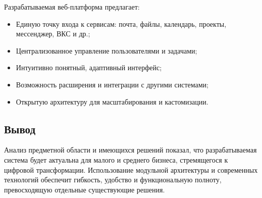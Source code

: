 Разрабатываемая веб-платформа предлагает:
\begin{itemize}
  \item Единую точку входа к сервисам: почта, файлы, календарь, проекты, мессенджер, ВКС и др.;
  \item Централизованное управление пользователями и задачами;
  \item Интуитивно понятный, адаптивный интерфейс;
  \item Возможность расширения и интеграции с другими системами;
  \item Открытую архитектуру для масштабирования и кастомизации.
\end{itemize}

\subsection{Вывод}

Анализ предметной области и имеющихся решений показал, что разрабатываемая система будет актуальна для малого и среднего бизнеса, стремящегося к цифровой трансформации. Использование модульной архитектуры и современных технологий обеспечит гибкость, удобство и функциональную полноту, превосходящую отдельные существующие решения.